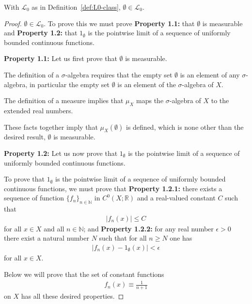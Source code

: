\begin{proposition}
    \label{prpstn:L0-contains-empty}
    \leanok
    With $\mathcal{L}_0$ as in Definition~\ref{def:L0-class}, $\emptyset \in \mathcal{L}_0$.
\end{proposition}
\begin{proof}
    \leanok
$\emptyset \in \mathcal{L}_0$. To prove this we must prove \textbf{Property 1.1:} that $\emptyset$ is measurable and \textbf{Property 1.2:} that $1_\emptyset$ is the pointwise limit of a sequence of uniformly bounded continuous functions.

\textbf{Property 1.1:} Let us first prove that $\emptyset$ is measurable.

The definition of a $\sigma$-algebra requires that the empty set $\emptyset$ is an element of any $\sigma$-algebra, in particular the empty set $\emptyset$ is an element of the $\sigma$-algebra of $X$.

The definition of a measure implies that $\mu_X$ maps the $\sigma$-algebra of $X$ to the extended real numbers.

These facts together imply that $\mu_X(\emptyset)$ is defined, which is none other than the desired result, $\emptyset$ is measurable.

\textbf{Property 1.2:} Let us now prove that $1_\emptyset$ is the pointwise limit of a sequence of uniformly bounded continuous functions.

To prove that $1_\emptyset$ is the pointwise limit of a sequence of uniformly bounded continuous functions, we must prove that \textbf{Property 1.2.1:} there exists a sequence of function $\{ f_n \}_{n \in \mathbb{N}}$ in $C^0(X; \mathbb{R})$ and a real-valued constant $C$ such that
\begin{align}
    \lvert f_n(x) \rvert \le C
\end{align}
for all $x \in X$ and all $n \in \mathbb{N}$; and \textbf{Property 1.2.2:} for any real number $\epsilon > 0$ there exist a natural number $N$ such that for all $n \ge N$ one has
\begin{align}
    \lvert f_n(x) - 1_\emptyset(x) \rvert < \epsilon
\end{align}
for all $x \in X$.

Below we will prove that the set of constant functions
\begin{align}
    f_n(x) \equiv \frac{1}{n + 1}
\end{align}
on $X$ has all these desired properties.


\end{proof}
